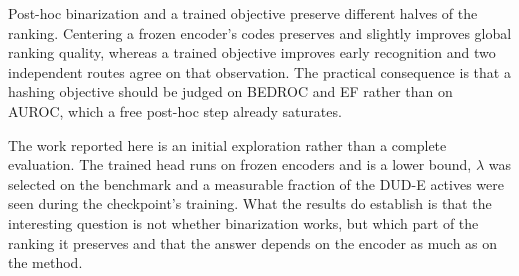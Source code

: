 \documentclass[10pt,a4paper]{article}
\begin{document}
Post-hoc binarization and a trained objective preserve different halves of the ranking. Centering a frozen encoder's 
codes preserves and slightly improves global ranking quality, whereas a trained objective improves early recognition 
and two independent routes agree on that observation. The practical consequence is that a hashing objective
should be judged on BEDROC and EF rather than on AUROC, which a free post-hoc step already
saturates. 

The work reported here is an initial exploration rather than a complete evaluation. The trained head runs on frozen 
encoders and is a lower bound, $\lambda$ was selected on the benchmark and a measurable fraction of the DUD-E actives 
were seen during the checkpoint's training. What the results do establish is that the interesting question is not 
whether binarization works, but which part of the ranking it preserves and that the answer depends on the encoder as 
much as on the method.

{\small
\setlength{\bibsep}{0.3ex}


}
\end{document}
